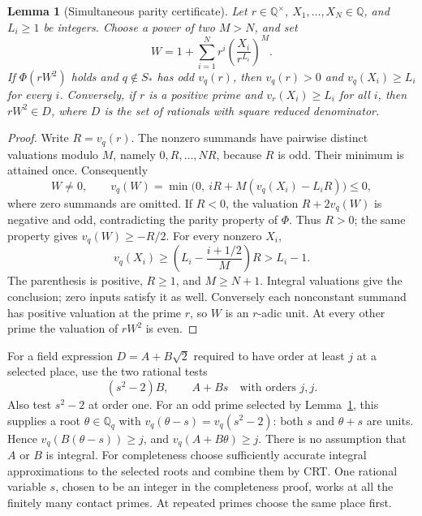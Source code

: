 \documentclass[11pt]{article}
\newtheorem{lemma}[theorem]{Lemma}
\theoremstyle{definition}
\newcommand{\Q}{\mathbb Q}\newcommand{\Z}{\mathbb Z}
\begin{document}
\begin{lemma}[Simultaneous parity certificate]\label{lem:batch}
Let \(r\in\Q^\times\), \(X_1,\ldots,X_N\in\Q\), and
\(L_i\ge1\) be integers. Choose a power of two \(M>N\), and set
\[
 W=1+\sum_{i=1}^N r^i\left(\frac{X_i}{r^{L_i}}\right)^M.
\]
If \(\Phi(rW^2)\) holds and \(q\notin S_*\) has odd
\(v_q(r)\), then \(v_q(r)>0\) and \(v_q(X_i)\ge L_i\)
for every \(i\). Conversely, if \(r\) is a positive prime and
\(v_r(X_i)\ge L_i\) for all \(i\), then \(rW^2\in D\),
where \(D\) is the set of rationals with square reduced denominator.
\end{lemma}
\begin{proof}
Write \(R=v_q(r)\). The nonzero summands have pairwise distinct
valuations modulo \(M\), namely \(0,R,\ldots,NR\), because
\(R\) is odd. Their minimum is attained once. Consequently
\[
 W\ne0,\qquad v_q(W)=\min\bigl(0,\ iR+M(v_q(X_i)-L_iR)\bigr)\le0,
\]
where zero summands are omitted. If \(R<0\), the valuation
\(R+2v_q(W)\) is negative and odd, contradicting the parity
property of \(\Phi\). Thus \(R>0\); the same property gives
\(v_q(W)\ge-R/2\). For every nonzero \(X_i\),
\[
 v_q(X_i)\ge\left(L_i-\frac{i+1/2}{M}\right)R>L_i-1.
\]
The parenthesis is positive, \(R\ge1\), and \(M\ge N+1\).
Integral valuations give the conclusion; zero inputs satisfy it as
well. Conversely each nonconstant summand has positive valuation at
the prime \(r\), so \(W\) is an \(r\)-adic unit. At every
other prime the valuation of \(rW^2\) is even.
\end{proof}

For a field expression \(D=A+B\sqrt2\) required to have order
at least \(j\) at a selected place, use the two rational tests
\begin{equation}\label{eq:batch-field-tests}
                   (s^2-2)B,\qquad A+Bs
                   \quad\text{with orders }j,j.
\end{equation}
Also test \(s^2-2\) at order one. For an odd prime selected by
Lemma~\ref{lem:batch}, this supplies a root \(\theta\in\Q_q\)
with \(v_q(\theta-s)=v_q(s^2-2)\): both \(s\) and
\(\theta+s\) are units. Hence
\(v_q(B(\theta-s))\ge j\), and \(v_q(A+B\theta)\ge j\).
There is no assumption that \(A\) or \(B\) is integral.
For completeness choose sufficiently accurate integral approximations
to the selected roots and combine them by CRT. One rational variable
\(s\), chosen to be an integer in the completeness proof, works at
all the finitely many contact primes. At repeated primes choose the
same place first.
\end{document}
